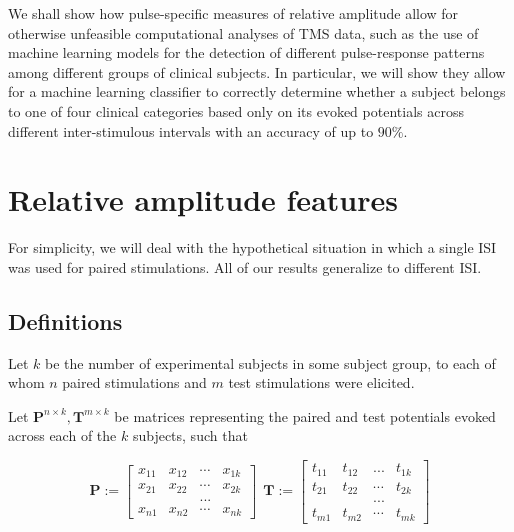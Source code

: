 \documentclass{article}
\begin{document}
\begin{multicols}{2}
We shall show how pulse-specific measures of relative amplitude allow for
otherwise unfeasible computational analyses of TMS data, such as the use of
machine learning models for the detection of different pulse-response patterns
among different groups of clinical subjects. In particular, we will show they
allow for a machine learning classifier to correctly determine whether a
subject belongs to one of four clinical categories based only on its evoked
potentials across different inter-stimulous intervals with an accuracy of up to
$90\%$.

\section{Relative amplitude features}

For simplicity, we will deal with the hypothetical situation
in which a single ISI was used for paired stimulations. All
of our results generalize to different ISI.

\subsection{Definitions}

Let $k$ be the number of experimental subjects in some
subject group, to each of whom $n$ paired stimulations and
$m$ test stimulations were elicited.

\begin{definition}

    Let $\textbf{P}^{n \times k}, \textbf{T}^{m\times k}$ be
    matrices representing the paired and test potentials
    evoked across each of the $k$ subjects, such that  

    \begin{equation} \textbf{P} := \begin{bmatrix}x_{11} &
    x_{12}& \cdots & x_{1k} \\ x_{21} & x_{22}& \cdots &
x_{2k} \\ & & ... & \\ x_{n1} & x_{n2}& \cdots & x_{nk}
\end{bmatrix} ~~ \textbf{T}:= \begin{bmatrix}t_{11} &
t_{12}& ... & t_{1k} \\ t_{21} & t_{22}& \cdots & t_{2k} \\
      & & ... & \\ t_{m1} & t_{m2}& \cdots & t_{mk}
\end{bmatrix} \end{equation} \end{definition}


\end{multicols}
\end{document}
